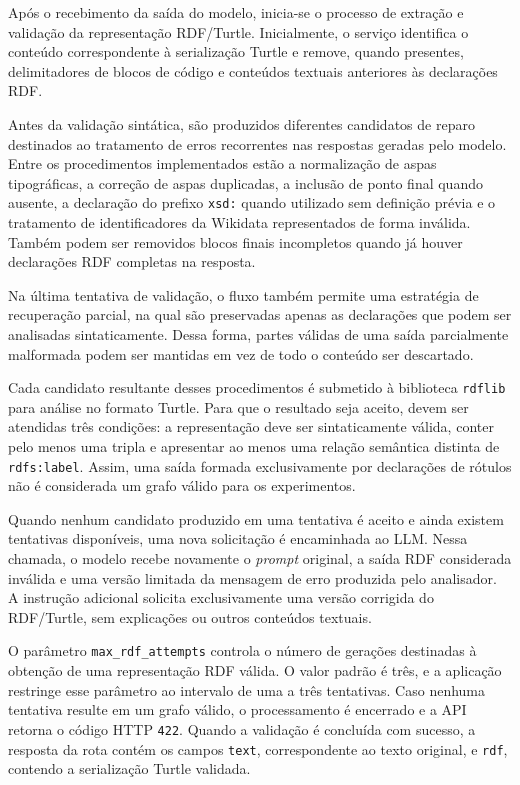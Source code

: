 Após o recebimento da saída do modelo, inicia-se o processo de extração e validação da representação RDF/Turtle. Inicialmente, o serviço identifica o conteúdo correspondente à serialização Turtle e remove, quando presentes, delimitadores de blocos de código e conteúdos textuais anteriores às declarações RDF.

Antes da validação sintática, são produzidos diferentes candidatos de reparo destinados ao tratamento de erros recorrentes nas respostas geradas pelo modelo. Entre os procedimentos implementados estão a normalização de aspas tipográficas, a correção de aspas duplicadas, a inclusão de ponto final quando ausente, a declaração do prefixo \texttt{xsd:} quando utilizado sem definição prévia e o tratamento de identificadores da Wikidata representados de forma inválida. Também podem ser removidos blocos finais incompletos quando já houver declarações RDF completas na resposta.

Na última tentativa de validação, o fluxo também permite uma estratégia de recuperação parcial, na qual são preservadas apenas as declarações que podem ser analisadas sintaticamente. Dessa forma, partes válidas de uma saída parcialmente malformada podem ser mantidas em vez de todo o conteúdo ser descartado.

Cada candidato resultante desses procedimentos é submetido à biblioteca \texttt{rdflib} para análise no formato Turtle. Para que o resultado seja aceito, devem ser atendidas três condições: a representação deve ser sintaticamente válida, conter pelo menos uma tripla e apresentar ao menos uma relação semântica distinta de \texttt{rdfs:label}. Assim, uma saída formada exclusivamente por declarações de rótulos não é considerada um grafo válido para os experimentos.

Quando nenhum candidato produzido em uma tentativa é aceito e ainda existem tentativas disponíveis, uma nova solicitação é encaminhada ao LLM. Nessa chamada, o modelo recebe novamente o \textit{prompt} original, a saída RDF considerada inválida e uma versão limitada da mensagem de erro produzida pelo analisador. A instrução adicional solicita exclusivamente uma versão corrigida do RDF/Turtle, sem explicações ou outros conteúdos textuais.

O parâmetro \texttt{max\_rdf\_attempts} controla o número de gerações destinadas à obtenção de uma representação RDF válida. O valor padrão é três, e a aplicação restringe esse parâmetro ao intervalo de uma a três tentativas. Caso nenhuma tentativa resulte em um grafo válido, o processamento é encerrado e a API retorna o código HTTP \texttt{422}. Quando a validação é concluída com sucesso, a resposta da rota contém os campos \texttt{text}, correspondente ao texto original, e \texttt{rdf}, contendo a serialização Turtle validada.


